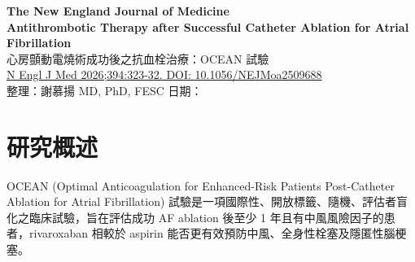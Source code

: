 \documentclass[12pt,a4paper]{article}
\begin{document}

\begin{center}
{\LARGE\bfseries\textcolor{emergency_red}{The New England Journal of Medicine}}\\[0.5cm]
{\Large\textbf{Antithrombotic Therapy after Successful Catheter Ablation for Atrial Fibrillation}}\\[0.3cm]
{\large 心房顫動電燒術成功後之抗血栓治療：OCEAN 試驗}\\[0.5cm]
{\normalsize \href{https://doi.org/10.1056/NEJMoa2509688}{N Engl J Med 2026;394:323-32. DOI: 10.1056/NEJMoa2509688}}\\[0.3cm]
{\normalsize 整理：謝慕揚 MD, PhD, FESC \quad 日期：\mydate}
\end{center}

\vspace{0.5cm}



\tableofcontents
\newpage

\section{研究概述}

OCEAN (Optimal Anticoagulation for Enhanced-Risk Patients Post-Catheter Ablation for Atrial Fibrillation) 試驗是一項國際性、開放標籤、隨機、評估者盲化之臨床試驗，旨在評估成功 AF ablation 後至少 1 年且有中風風險因子的患者，rivaroxaban 相較於 aspirin 能否更有效預防中風、全身性栓塞及隱匿性腦梗塞。
\end{document}
